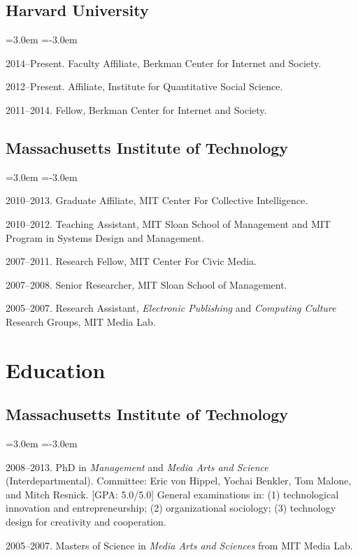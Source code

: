 \documentclass[10pt]{article}
\newenvironment{cvlist}{
\begin{list}{}{\leftmargin=3.0em \itemindent=-3.0em}
  \setlength{\itemsep}{0pt}
  \setlength{\parskip}{0em}
  \setlength{\parsep}{1em}
  \setlength{\parindent}{0em}}
{\vspace{1em}
\end{list}}
\begin{document}
\subsection{Harvard University}
\begin{cvlist}
\item 2014--Present. Faculty Affiliate, Berkman Center for Internet and Society.
\item 2012--Present. Affiliate, Institute for Quantitative Social Science.
\item 2011--2014. Fellow, Berkman Center for Internet and Society.
\end{cvlist}

\subsection{Massachusetts Institute of Technology}
\begin{cvlist}
\item 2010--2013. Graduate Affiliate, MIT Center For Collective Intelligence.
\item 2010--2012. Teaching Assistant, MIT Sloan School of Management and MIT Program in Systems Design and Management.
\item 2007--2011. Research Fellow, MIT Center For Civic Media.
\item 2007--2008. Senior Researcher, MIT Sloan School of Management.
\item 2005--2007. Research Assistant, \emph{Electronic Publishing} and \emph{Computing Culture} Research Groups, MIT Media Lab.
\end{cvlist}

\section{Education}

\subsection{Massachusetts Institute of Technology}
\begin{cvlist}

\item 2008--2013. PhD in \emph{Management} and \emph{Media
    Arts and Science} (Interdepartmental). Committee: Eric von Hippel, Yochai Benkler, Tom Malone, and Mitch Resnick. [GPA: 5.0/5.0] 
  General examinations in: (1) technological innovation and entrepreneurship; (2) organizational sociology; (3) technology design for creativity and cooperation.

\item 2005--2007. Masters of Science in \emph{Media Arts and Sciences} from MIT Media Lab. \newline [GPA: 5.0/5.0]
\end{cvlist}
\end{document}
